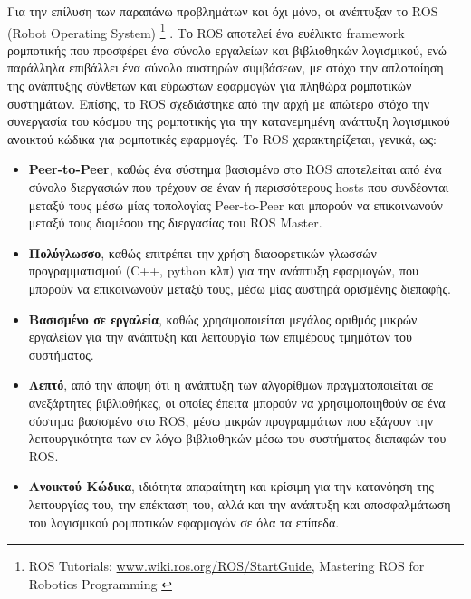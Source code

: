 \bigskip
Για την επίλυση των παραπάνω προβλημάτων και όχι μόνο, οι \citeauthor{ros} \cite{ros} ανέπτυξαν το ROS (Robot Operating System) \footnote{ROS Tutorials: \url{www.wiki.ros.org/ROS/StartGuide}, Mastering ROS for Robotics Programming \cite{mastering_ros}} . Το ROS αποτελεί ένα ευέλικτο framework ρομποτικής που προσφέρει ένα σύνολο εργαλείων και βιβλιοθηκών λογισμικού, ενώ παράλληλα επιβάλλει ένα σύνολο αυστηρών συμβάσεων, με στόχο την απλοποίηση της ανάπτυξης σύνθετων και εύρωστων εφαρμογών για πληθώρα ρομποτικών συστημάτων. Επίσης, το ROS σχεδιάστηκε από την αρχή με απώτερο στόχο την συνεργασία του κόσμου της ρομποτικής για την κατανεμημένη ανάπτυξη λογισμικού ανοικτού κώδικα για ρομποτικές εφαρμογές. Το ROS χαρακτηρίζεται, γενικά, ως:
\begin{itemize}
	\item \textbf{Peer-to-Peer}, καθώς ένα σύστημα βασισμένο στο ROS αποτελείται από ένα σύνολο διεργασιών που τρέχουν σε έναν ή περισσότερους hosts που συνδέονται μεταξύ τους μέσω μίας τοπολογίας Peer-to-Peer και μπορούν να επικοινωνούν μεταξύ τους διαμέσου της διεργασίας του ROS Master.
	\item \textbf{Πολύγλωσσο}, καθώς επιτρέπει την χρήση διαφορετικών γλωσσών προγραμματισμού (C++, python κλπ) για την ανάπτυξη εφαρμογών, που μπορούν να επικοινωνούν μεταξύ τους, μέσω μίας αυστηρά ορισμένης διεπαφής.
	\item \textbf{Βασισμένο σε εργαλεία}, καθώς χρησιμοποιείται μεγάλος αριθμός μικρών εργαλείων για την ανάπτυξη και λειτουργία των επιμέρους τμημάτων του συστήματος.
	\item \textbf{Λεπτό}, από την άποψη ότι η ανάπτυξη των αλγορίθμων πραγματοποιείται σε ανεξάρτητες βιβλιοθήκες, οι οποίες έπειτα μπορούν να χρησιμοποιηθούν σε ένα σύστημα βασισμένο στο ROS, μέσω μικρών προγραμμάτων που εξάγουν την λειτουργικότητα των εν λόγω βιβλιοθηκών μέσω του συστήματος διεπαφών του ROS.
	\item \textbf{Ανοικτού Κώδικα}, ιδιότητα απαραίτητη και κρίσιμη για την κατανόηση της λειτουργίας του, την επέκταση του, αλλά και την ανάπτυξη και αποσφαλμάτωση του λογισμικού ρομποτικών εφαρμογών σε όλα τα επίπεδα.
\end{itemize}

